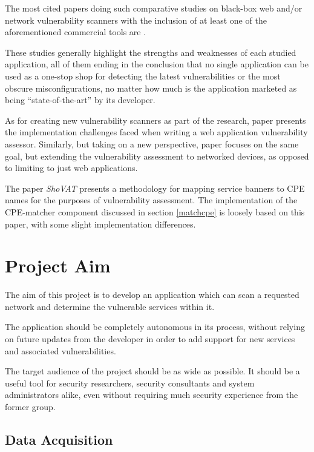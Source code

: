 \documentclass[a4paper,12pt]{article}
\begin{document}
	The most cited papers doing such comparative studies on black-box web and/or network vulnerability scanners with the inclusion of at least one of the aforementioned commercial tools are \cite{holm11,bau10,doupe10}.
	
	These studies generally highlight the strengths and weaknesses of each studied application, all of them ending in the conclusion that no single application can be used as a one-stop shop for detecting the latest vulnerabilities or the most obscure misconfigurations, no matter how much is the application marketed as being ``state-of-the-art'' by its developer.
	
	As for creating new vulnerability scanners as part of the research, paper \cite{kals06} presents the implementation challenges faced when writing a web application vulnerability assessor. Similarly, but taking on a new perspective, paper \cite{guo05} focuses on the same goal, but extending the vulnerability assessment to networked devices, as opposed to limiting to just web applications.
	
	The paper \textit{ShoVAT}\cite{shovat15} presents a methodology for mapping service banners to CPE names for the purposes of vulnerability assessment. The implementation of the CPE-matcher component discussed in section \ref{matchcpe} is loosely based on this paper, with some slight implementation differences.
	
\section{Project Aim}
 
	
	The aim of this project is to develop an application which can scan a requested network and determine the vulnerable services within it.
	
	The application should be completely autonomous in its process, without relying on future updates from the developer in order to add support for new services and associated vulnerabilities.
	
	The target audience of the project should be as wide as possible. It should be a useful tool for security researchers, security consultants and system administrators alike, even without requiring much security experience from the former group.
	
\subsection{Data Acquisition}
 
	
\end{document}
